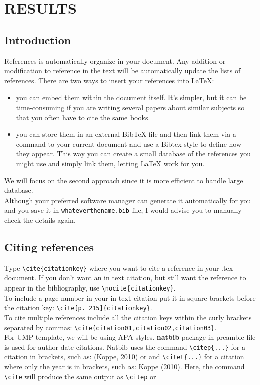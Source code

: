 \chapter{RESULTS}

\section{Introduction}
References is automatically organize in your document. Any addition or modification to reference in the text will be automatically update the lists of references. There are two ways to insert your references into {\LaTeX}:

\begin{itemize}
\item you can embed them within the document itself. It's simpler, but it can be time-consuming if you are writing several papers about similar subjects so that you often have to cite the same books.
\item you can store them in an external BibTeX file and then link them via a command to your current document and use a Bibtex style to define how they appear. This way you can create a small database of the references you might use and simply link them, letting {\LaTeX} work for you.
\end{itemize}

We will focus on the second approach since it is more efficient to handle large database.\\

Although your preferred software manager can generate it automatically for you and you save it in \verb+whateverthename.bib+ file, I would advise you to manually check the details again.

\section{Citing references}
Type \verb+\cite{citationkey}+ where you want to cite a reference in your .tex document. If you don’t want an in text citation, but still want the reference to appear in the bibliography, use \verb+\nocite{citationkey}+.\\

To include a page number in your in-text citation put it in square brackets before the citation key: \verb+\cite[p. 215]{citationkey}+.\\

To cite multiple references include all the citation keys within the curly brackets separated by commas: \verb+\cite{citation01,citation02,citation03}+.\\

For UMP template, we will be using APA styles. \textbf{natbib} package in preamble file is used for author-date citations. Natbib uses the command \verb+\citep{...}+ for a citation in brackets, such as: (Koppe, 2010) or \citet{Carvalho-etal-2008} and \verb+\citet{...}+ for a citation where only the year is in brackets, such as: Koppe (2010). Here, the command \verb+\cite+ will produce the same output as \verb+\citep+ or \citep{Carvalho-etal-2009}


